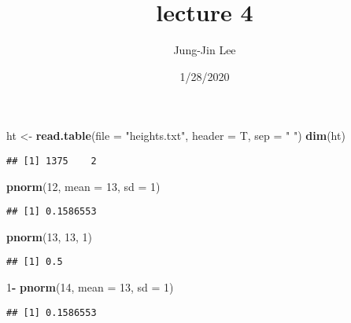 \documentclass[]{article}
\title{lecture 4}
\author{Jung-Jin Lee}
\date{1/28/2020}
\newenvironment{Shaded}{\begin{snugshade}}{\end{snugshade}}
\newcommand{\DataTypeTok}[1]{\textcolor[rgb]{0.13,0.29,0.53}{#1}}
\newcommand{\DecValTok}[1]{\textcolor[rgb]{0.00,0.00,0.81}{#1}}
\newcommand{\KeywordTok}[1]{\textcolor[rgb]{0.13,0.29,0.53}{\textbf{#1}}}
\newcommand{\NormalTok}[1]{#1}
\newcommand{\OperatorTok}[1]{\textcolor[rgb]{0.81,0.36,0.00}{\textbf{#1}}}
\newcommand{\StringTok}[1]{\textcolor[rgb]{0.31,0.60,0.02}{#1}}
\begin{document}
\maketitle

\begin{Shaded}
\begin{Highlighting}[]
\NormalTok{ht <-}\StringTok{ }\KeywordTok{read.table}\NormalTok{(}\DataTypeTok{file =} \StringTok{"heights.txt"}\NormalTok{, }\DataTypeTok{header =}\NormalTok{ T, }\DataTypeTok{sep =} \StringTok{" "}\NormalTok{)}
\KeywordTok{dim}\NormalTok{(ht)}
\end{Highlighting}
\end{Shaded}

\begin{verbatim}
## [1] 1375    2
\end{verbatim}

\begin{Shaded}
\begin{Highlighting}[]
\KeywordTok{pnorm}\NormalTok{(}\DecValTok{12}\NormalTok{, }\DataTypeTok{mean =} \DecValTok{13}\NormalTok{, }\DataTypeTok{sd =} \DecValTok{1}\NormalTok{)}
\end{Highlighting}
\end{Shaded}

\begin{verbatim}
## [1] 0.1586553
\end{verbatim}

\begin{Shaded}
\begin{Highlighting}[]
\KeywordTok{pnorm}\NormalTok{(}\DecValTok{13}\NormalTok{, }\DecValTok{13}\NormalTok{, }\DecValTok{1}\NormalTok{)}
\end{Highlighting}
\end{Shaded}

\begin{verbatim}
## [1] 0.5
\end{verbatim}

\begin{Shaded}
\begin{Highlighting}[]
\DecValTok{1}\OperatorTok{-}\StringTok{ }\KeywordTok{pnorm}\NormalTok{(}\DecValTok{14}\NormalTok{, }\DataTypeTok{mean =} \DecValTok{13}\NormalTok{, }\DataTypeTok{sd =} \DecValTok{1}\NormalTok{)}
\end{Highlighting}
\end{Shaded}

\begin{verbatim}
## [1] 0.1586553
\end{verbatim}
\end{document}
